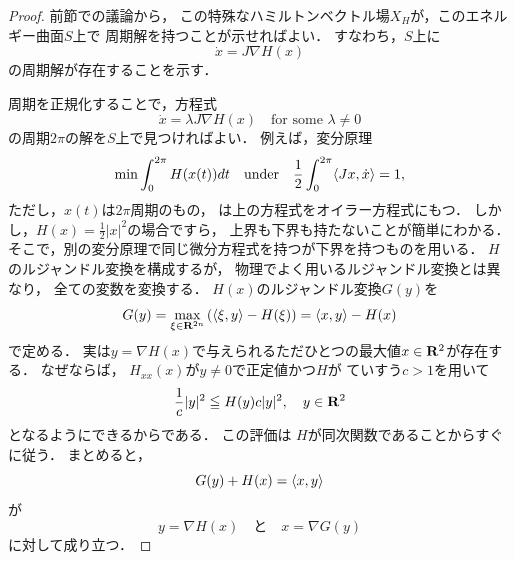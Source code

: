 \begin{proof}
    前節での議論から，
    この特殊なハミルトンベクトル場\(X_H\)が，このエネルギー曲面\(S\)上で
    周期解を持つことが示せればよい．
    すなわち，\(S\)上に
    \[
        \dot{x}=J\nabla H(x)
    \]
    の周期解が存在することを示す．

    周期を正規化することで，方程式
    \begin{equation}
        \dot{x}=\lambda J\nabla H(x) \quad \text{for some \(\lambda\ne0\)}
    \end{equation}
    の周期\(2\pi\)の解を\(S\)上で見つければよい．
    例えば，変分原理
    \[
        \min\int_{0}^{2\pi}H(x(t))dt 
        \quad
        \text{under}
        \quad
        \frac{1}{2}
        \int_{0}^{2\pi}\inner<Jx,\dot{x}>=1,
    \]
    ただし，\(x(t)\)は\(2\pi\)周期のもの，
    は上の方程式をオイラー方程式にもつ．
    しかし，\(H(x)=\frac{1}{2}\lvert{x}\rvert^2\)の場合ですら，
    上界も下界も持たないことが簡単にわかる．
    そこで，別の変分原理で同じ微分方程式を持つが下界を持つものを用いる．
    \(H\)のルジャンドル変換を構成するが，
    物理でよく用いるルジャンドル変換とは異なり，
    全ての変数を変換する．
    \(H(x)\)のルジャンドル変換\(G(y)\)を
    \[
        G(y)=\max_{\xi\in\rr^{2n}}\left(
            \inner<\xi,y>-H(\xi)
        \right)
        =\inner<x,y>-H(x)
    \]
    で定める．
    実は\(y=\nabla H(x)\)で与えられるただひとつの最大値\(x\in\mathbf{R}^2\)が存在する．
    なぜならば，
    \(H_{xx}(x)\)が\(y\ne0\)で正定値かつ\(H\)が
    ていすう\(c>1\)を用いて
    \begin{equation}
        \frac{1}{c}\lvert{y}\rvert^{2}
        \leqq
        H(y)
        c\lvert{y}\rvert^{2},\quad y\in\mathbf{R}^2
    \end{equation}
    となるようにできるからである．
    この評価は
    \(H\)が同次関数であることからすぐに従う．
    まとめると，
    \begin{equation}
        G(y)+H(x)=\inner<x,y>
    \end{equation}
    が\begin{equation}
        y=\nabla H(x)\quad\text{と}\quad x=\nabla G(y)
    \end{equation}
    に対して成り立つ．


\end{proof}
